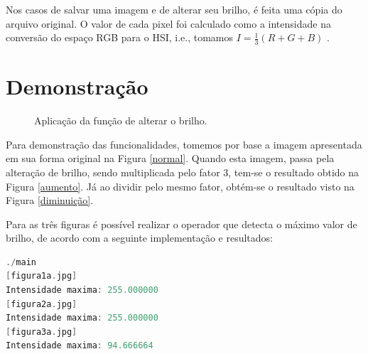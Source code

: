 \documentclass[a4paper, 10pt, conference]{ieeeconf}
\begin{document}
Nos casos de salvar uma imagem e de alterar seu brilho, é feita uma cópia do arquivo original. O valor de cada pixel foi calculado como a intensidade na conversão do espaço RGB para o HSI, i.e., tomamos $I=\frac{1}{3}(R+G+B)$ \cite{rgb}.



\section{Demonstração}


\begin{figure}[h]
	\centering
	\hspace{0.05cm}
	\hspace{0.05cm}
	\caption{Aplicação da função de alterar o brilho.}
	\label{comp}
\end{figure}

Para demonstração das funcionalidades, tomemos por base a imagem apresentada em sua forma original na Figura \ref{normal}. Quando esta imagem, passa pela alteração de brilho, sendo multiplicada pelo fator 3, tem-se o resultado obtido na Figura \ref{aumento}. Já ao dividir pelo mesmo fator, obtém-se o resultado visto na Figura \ref{diminuição}.

Para as três figuras é possível realizar o operador que detecta o máximo valor de brilho, de acordo com a seguinte implementação e resultados:


\begin{lstlisting}[language=C, basicstyle=\footnotesize, frame=single]
./main
[figura1a.jpg]
Intensidade maxima: 255.000000
[figura2a.jpg]
Intensidade maxima: 255.000000
[figura3a.jpg]
Intensidade maxima: 94.666664
\end{lstlisting}
\end{document}
